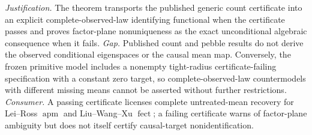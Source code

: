 \documentclass{article}
\begin{document}
\par\smallskip\noindent \textit{Justification.} The theorem transports the published generic count certificate into an explicit complete-observed-law identifying functional when the certificate passes and proves factor-plane nonuniqueness as the exact unconditional algebraic consequence when it fails. \textit{Gap.} Published count and pebble results do not derive the observed conditional eigenspaces or the causal mean map. Conversely, the frozen primitive model includes a nonempty tight-radius certificate-failing specification with a constant zero target, so complete-observed-law countermodels with different missing means cannot be asserted without further restrictions. \textit{Consumer.} A passing certificate licenses complete untreated-mean recovery for Lei--Ross \(\operatorname{apm}\) and Liu--Wang--Xu \(\operatorname{fect}\); a failing certificate warns of factor-plane ambiguity but does not itself certify causal-target nonidentification.
\end{document}
